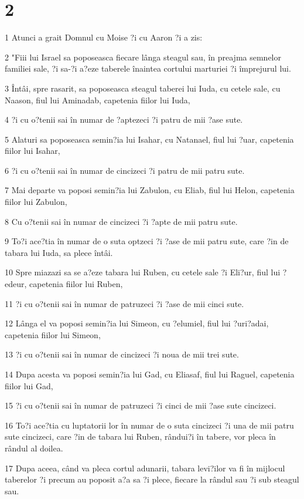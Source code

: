 \chapter{2}

\par 1 Atunci a grait Domnul cu Moise ?i cu Aaron ?i a zis:
\par 2 "Fiii lui Israel sa poposeasca fiecare lânga steagul sau, în preajma semnelor familiei sale, ?i sa-?i a?eze taberele înaintea cortului marturiei ?i împrejurul lui.
\par 3 Întâi, spre rasarit, sa poposeasca steagul taberei lui Iuda, cu cetele sale, cu Naason, fiul lui Aminadab, capetenia fiilor lui Iuda,
\par 4 ?i cu o?tenii sai în numar de ?aptezeci ?i patru de mii ?ase sute.
\par 5 Alaturi sa poposeasca semin?ia lui Isahar, cu Natanael, fiul lui ?uar, capetenia fiilor lui Isahar,
\par 6 ?i cu o?tenii sai în numar de cincizeci ?i patru de mii patru sute.
\par 7 Mai departe va poposi semin?ia lui Zabulon, cu Eliab, fiul lui Helon, capetenia fiilor lui Zabulon,
\par 8 Cu o?tenii sai în numar de cincizeci ?i ?apte de mii patru sute.
\par 9 To?i ace?tia în numar de o suta optzeci ?i ?ase de mii patru sute, care ?in de tabara lui Iuda, sa plece întâi.
\par 10 Spre miazazi sa se a?eze tabara lui Ruben, cu cetele sale ?i Eli?ur, fiul lui ?edeur, capetenia fiilor lui Ruben,
\par 11 ?i cu o?tenii sai în numar de patruzeci ?i ?ase de mii cinci sute.
\par 12 Lânga el va poposi semin?ia lui Simeon, cu ?elumiel, fiul lui ?uri?adai, capetenia fiilor lui Simeon,
\par 13 ?i cu o?tenii sai în numar de cincizeci ?i noua de mii trei sute.
\par 14 Dupa acesta va poposi semin?ia lui Gad, cu Eliasaf, fiul lui Raguel, capetenia fiilor lui Gad,
\par 15 ?i cu o?tenii sai în numar de patruzeci ?i cinci de mii ?ase sute cincizeci.
\par 16 To?i ace?tia cu luptatorii lor în numar de o suta cincizeci ?i una de mii patru sute cincizeci, care ?in de tabara lui Ruben, rândui?i în tabere, vor pleca în rândul al doilea.
\par 17 Dupa aceea, când va pleca cortul adunarii, tabara levi?ilor va fi în mijlocul taberelor ?i precum au poposit a?a sa ?i plece, fiecare la rândul sau ?i sub steagul sau.
